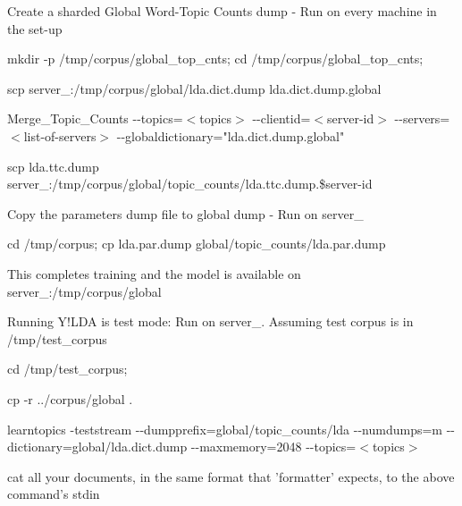 \begin{DoxyEnumerate}
\begin{DoxyEnumerate}
\begin{DoxyEnumerate}
Create a sharded Global Word-\/Topic Counts dump -\/ Run on every machine in the set-\/up 
\begin{DoxyEnumerate}
\item 

{\ttfamily mkdir -\/p /tmp/corpus/global\_\-top\_\-cnts; cd /tmp/corpus/global\_\-top\_\-cnts;} 
\item 

{\ttfamily scp server\_:/tmp/corpus/global/lda.dict.dump lda.dict.dump.global} 
\item 

{\ttfamily Merge\_\-Topic\_\-Counts -\/-\/topics=$<$topics$>$ -\/-\/clientid=$<$server-\/id$>$ -\/-\/servers=$<$list-\/of-\/servers$>$ -\/-\/globaldictionary="lda.dict.dump.global"} 
\item 

{\ttfamily scp lda.ttc.dump server\_:/tmp/corpus/global/topic\_\-counts/lda.ttc.dump.\$server-\/id} 
\end{DoxyEnumerate}
\item 

Copy the parameters dump file to global dump -\/ Run on server\_ 
\begin{DoxyEnumerate}
\item 

{\ttfamily cd /tmp/corpus; cp lda.par.dump global/topic\_\-counts/lda.par.dump} 
\end{DoxyEnumerate}
\item 

This completes training and the model is available on server\_:/tmp/corpus/global 
\end{DoxyEnumerate}
\item 

Running Y!LDA is test mode: Run on server\_. Assuming test corpus is in /tmp/test\_\-corpus 
\begin{DoxyEnumerate}
\item 

{\ttfamily cd /tmp/test\_\-corpus;}  
\item 

{\ttfamily cp -\/r ../corpus/global .} 
\item 

{\ttfamily learntopics -\/teststream -\/-\/dumpprefix=global/topic\_\-counts/lda -\/-\/numdumps=m -\/-\/dictionary=global/lda.dict.dump -\/-\/maxmemory=2048 -\/-\/topics=$<$topics$>$} 
\item 

cat all your documents, in the same format that 'formatter' expects, to the above command's stdin 
\end{DoxyEnumerate}
\end{DoxyEnumerate}
\end{DoxyEnumerate}